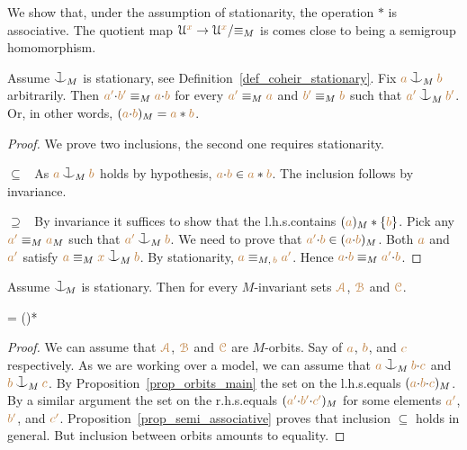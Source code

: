 We show that, under the assumption of stationarity,
the operation $*$ is associative.
The quotient map $\EuScript U^{\color{brown} x}\to\EuScript U^{\color{brown} x}/{\equiv_M}$ is comes close to being a semigroup homomorphism.

\begin{proposition}\label{prop_orbits_main}
Assume $\cnonfork_M$ is stationary,
see Definition~\ref{def_coheir_stationary}.
Fix ${\mr a}\cnonfork_M{\mr b}$ arbitrarily.
Then ${\color{brown} a'}{\cdot}{\color{brown} b'}\equiv_M{\color{brown} a}{\cdot}{\color{brown} b}$ for every 
${\color{brown} a'}\equiv_M{\color{brown} a}$ and  ${\color{brown} b'}\equiv_M{\color{brown} b}$ such that
${\mr a'}\cnonfork_M{\mr b'}$.
Or, in other words, $({\color{brown} a}{\cdot}{\color{brown} b})_M={\color{brown} a}*{\color{brown} b}$.
\end{proposition}
%
\begin{proof} 
We prove two inclusions, the second one requires stationarity.

$\subseteq$ \ As ${\mr a}\cnonfork_M{\mr b}$ holds by hypothesis,
${\color{brown} a}{\cdot}{\color{brown} b}\in{\color{brown}a}*{\color{brown} b}$.
The inclusion follows by invariance.

$\supseteq$ \ By invariance it suffices to show that the l.h.s.\@ contains $({\color{brown} a})_M*\{{\color{brown} b}\}$.
Pick any ${\color{brown} a'}\equiv_M{\color{brown} a}_M$ such that ${\mr a'}\cnonfork_M{\mr b}$.
We need to prove that ${\color{brown} a'}{\cdot}{\color{brown} b}\in({\color{brown} a}{\cdot}{\color{brown} b})_M$.
Both ${\color{brown} a}$ and ${\color{brown} a'}$ satisfy ${\mr a}\equiv_M{\mr x}\cnonfork_M{\mr b}$.
By stationarity,
${\color{brown} a}\equiv_{M,\,{\color{brown} b}}{\color{brown} a'}$.
Hence ${\color{brown} a}{\cdot}{\color{brown} b}\equiv_M{\color{brown} a'}{\cdot}{\color{brown} b}$.
\end{proof}

\begin{corollary}[ (associativity)]\label{corol_orbits_associative}
Assume $\cnonfork_{\!M}$ is stationary.
Then for every $M$-invariant sets ${\color{brown}\EuScript A}$,
${\color{brown}\EuScript B}$ and  ${\color{brown}\EuScript C}$.

\ceq{\hfill\mrA*\big(\mrB*\mrC\big)}
{=}
{\big(\mrA*\mrB\big)*\mrC}
\end{corollary}

\begin{proof}
We can assume that ${\color{brown}\EuScript A}$, ${\color{brown}\EuScript B}$ and ${\color{brown}\EuScript C}$ are $M$-orbits.
Say of ${\color{brown} a}$, ${\color{brown} b}$, and ${\color{brown} c}$ respectively.
As we are working over a model,
we can assume that ${\mr a}\cnonfork_M{\mr b}{\cdot}{\mr c}$ and ${\mr b}\cnonfork_M{\mr c}$.
By Proposition~\ref{prop_orbits_main} the set on the l.h.s.\@ equals $({\color{brown} a}{\cdot}{\color{brown} b}{\cdot}{\color{brown} c})_M$.
By a similar argument the set on the r.h.s.\@ equals $({\color{brown} a'}{\cdot}{\color{brown} b'}{\cdot}{\color{brown} c'})_M$ for some elements ${\color{brown} a'}$, ${\color{brown} b'}$, and ${\color{brown} c'}$.
Proposition~\ref{prop_semi_associative} proves that inclusion $\subseteq$ holds in general.
But inclusion between orbits amounts to equality.
\end{proof}

